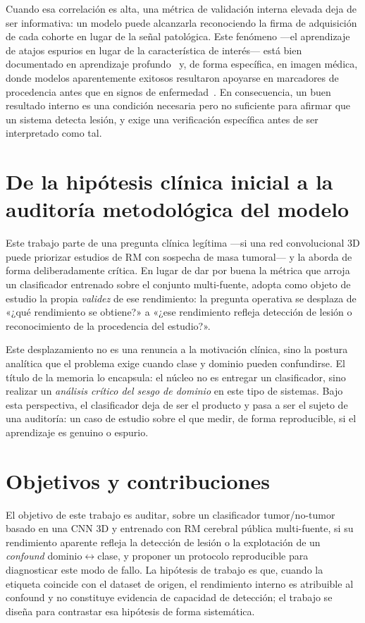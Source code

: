 Cuando esa correlación es alta, una métrica de validación interna elevada deja de
ser informativa: un modelo puede alcanzarla reconociendo la firma de adquisición
de cada cohorte en lugar de la señal patológica. Este fenómeno ---el aprendizaje
de atajos espurios en lugar de la característica de interés--- está bien
documentado en aprendizaje profundo~\cite{geirhos2020shortcut} y, de forma
específica, en imagen médica, donde modelos aparentemente exitosos resultaron
apoyarse en marcadores de procedencia antes que en signos de
enfermedad~\cite{zech2018pneumonia}. En consecuencia, un buen resultado interno es
una condición necesaria pero no suficiente para afirmar que un sistema detecta
lesión, y exige una verificación específica antes de ser interpretado como tal.

\section{De la hipótesis clínica inicial a la auditoría metodológica del modelo}

Este trabajo parte de una pregunta clínica legítima ---si una red convolucional
3D puede priorizar estudios de RM con sospecha de masa tumoral--- y la aborda de
forma deliberadamente crítica. En lugar de dar por buena la métrica que arroja un
clasificador entrenado sobre el conjunto multi-fuente, adopta como objeto de
estudio la propia \emph{validez} de ese rendimiento: la pregunta operativa se
desplaza de «¿qué rendimiento se obtiene?» a «¿ese rendimiento refleja detección
de lesión o reconocimiento de la procedencia del estudio?».

Este desplazamiento no es una renuncia a la motivación clínica, sino la postura
analítica que el problema exige cuando clase y dominio pueden confundirse. El
título de la memoria lo encapsula: el núcleo no es entregar un clasificador, sino
realizar un \emph{análisis crítico del sesgo de dominio} en este tipo de sistemas.
Bajo esta perspectiva, el clasificador deja de ser el producto y pasa a ser el
sujeto de una auditoría: un caso de estudio sobre el que medir, de forma
reproducible, si el aprendizaje es genuino o espurio.

\section{Objetivos y contribuciones}

El objetivo de este trabajo es auditar, sobre un clasificador tumor/no-tumor
basado en una CNN 3D y entrenado con RM cerebral pública multi-fuente, si su
rendimiento aparente refleja la detección de lesión o la explotación de un
\emph{confound} dominio$\leftrightarrow$clase, y proponer un protocolo
reproducible para diagnosticar este modo de fallo. La hipótesis de trabajo es que,
cuando la etiqueta coincide con el dataset de origen, el rendimiento interno es
atribuible al confound y no constituye evidencia de capacidad de detección; el
trabajo se diseña para contrastar esa hipótesis de forma sistemática.

